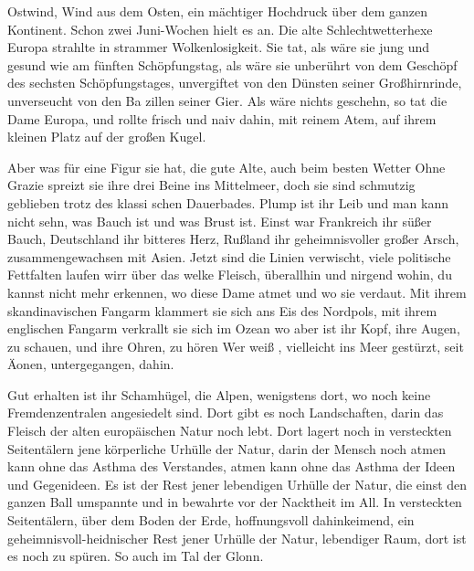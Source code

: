 

\noindent{}%
Ostwind, Wind aus dem Osten, ein mächtiger Hochdruck über
dem ganzen Kontinent. Schon zwei Juni-Wochen hielt es an.
Die alte Schlechtwetterhexe Europa strahlte in strammer
Wolkenlosigkeit. Sie tat, als wäre sie jung und ge\-sund wie
am fünften Schöpfungstag, als wäre sie unberührt von dem
Geschöpf des sechsten Schöpfungstages, unvergiftet von den
Dünsten seiner Großhirnrinde, unverseucht von den Ba\-%
zillen seiner Gier. Als wäre nichts geschehn, so tat die Dame
Europa, und rollte frisch und naiv dahin, mit reinem Atem,
auf ihrem kleinen Platz auf der großen Kugel.

Aber was für eine Figur sie hat, die gute Alte, auch beim
besten Wetter\ausr{} Ohne Grazie spreizt sie ihre drei Beine ins
Mittelmeer, doch sie sind schmutzig geblieben trotz des klassi\-%
schen Dauerbades. Plump ist ihr Leib und man kann nicht
sehn, was Bauch ist und was Brust ist. Einst war Frankreich
ihr süßer Bauch, Deutschland ihr bitteres Herz, Rußland ihr
geheimnisvoller großer Arsch, zusammengewachsen mit Asien.
Jetzt sind die Linien verwischt, viele politische Fettfalten
laufen wirr über das welke Fleisch, überallhin und nirgend\-%
wohin, du kannst nicht mehr erkennen, wo diese Dame atmet
und wo sie verdaut. Mit ihrem skandinavischen Fangarm
klammert sie sich ans Eis des Nordpols, mit ihrem englischen
Fangarm verkrallt sie sich im Ozean\dopp{} wo aber ist ihr Kopf,
ihre Augen, zu schauen, und ihre Ohren, zu hören\frag{} Wer weiß%
\eingriff{weiß, vielleicht ] weiß vielleicht},
vielleicht ins Meer gestürzt, seit Äonen, untergegangen,
dahin.

Gut erhalten ist ihr Schamhügel, die Alpen, wenigstens dort,
wo noch keine Fremdenzentralen angesiedelt sind. Dort gibt
es noch Landschaften, darin das Fleisch der alten europäischen
Natur noch lebt. Dort lagert noch in versteckten Seitentälern
jene körperliche Urhülle der Natur, darin der Mensch noch
atmen kann ohne das Asthma des Verstandes, atmen kann
ohne das Asthma der Ideen und Gegenideen. Es ist der Rest
jener lebendigen Urhülle der Natur, die einst den ganzen
Ball umspannte und in bewahrte vor der Nacktheit im All.
In versteckten Seitentälern, über dem Boden der Erde,
hoffnungsvoll dahinkeimend, ein geheimnisvoll-heidnischer
Rest jener Urhülle der Natur, lebendiger Raum, dort ist es
noch zu spüren. So auch im Tal der Glonn.

